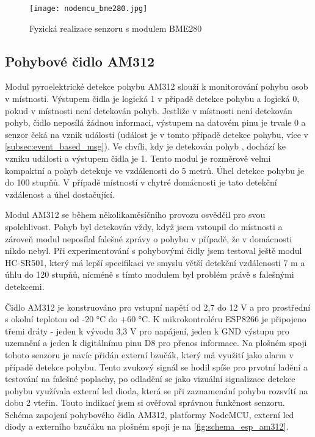 \begin{figure}[H]
  \centering
  \texttt{[image: nodemcu\_bme280.jpg]}
  \caption{Fyzická realizace senzoru s modulem BME280}
  \label{fig:nodemcu_bme280}
\end{figure} 

\subsection{Pohybové čidlo AM312}

Modul pyroelektrické detekce pohybu AM312 slouží k monitorování pohybu osob v místnosti. Výstupem čidla je logická 1 v případě detekce pohybu a logická 0, pokud v místnosti není detekován pohyb. Jestliže v místnosti není detekován pohyb, čidlo neposílá žádnou informaci, výstupem na datovém pinu je trvale 0 a senzor čeká na vznik události (událost je v tomto případě detekce pohybu, více v \cref{subsec:event_based_msg}). Ve chvíli, kdy je detekován pohyb , dochází ke vzniku události a výstupem čidla je 1. Tento modul je rozměrově velmi kompaktní a pohyb detekuje ve vzdálenosti do 5 metrů. Úhel detekce pohybu je do 100 stupňů. V případě místností v chytré domácnosti je tato detekční vzdálenost a úhel dostačující. \par 
Modul AM312 se během několikaměsíčního provozu osvědčil pro svou spolehlivost. Pohyb byl detekován vždy, když jsem vstoupil do místnosti a zároveň modul neposílal falešné zprávy o pohybu v případě, že v domácnosti nikdo nebyl. Při experimentování s pohybovými čidly jsem testoval ještě modul HC-SR501, který má lepší specifikaci ve smyslu větší detekční vzdálenosti 7 m a úhlu do 120 stupňů, nicméně s tímto modulem byl problém právě s falešnými detekcemi. \par
Čidlo AM312 je konstruováno pro vstupní napětí od 2,7 do 12 V a pro prostřední s okolní teplotou od -20 \si{\degree}C do +60 \si{\degree}C. K mikrokontroléru ESP8266 je připojeno třemi dráty - jeden k vývodu 3,3 V pro napájení, jeden k GND výstupu pro uzemnění a jeden k digitálnímu pinu D8 pro přenos informace. Na plošném spoji tohoto senzoru je navíc přidán externí bzučák, který má využití jako alarm v případě detekce pohybu. Tento zvukový signál se hodil spíše pro prvotní ladění a testování na falešné poplachy, po odladění se jako vizuální signalizace detekce pohybu využívala externí led dioda, která se při zaznamenání pohybu rozsvítí na dobu 2 vteřin. Touto indikací jsem si ověřoval správnou funkčnost senzoru. Schéma zapojení pohybového čidla AM312, platformy NodeMCU, externí led diody a externího bzučáku na plošném spoji je na \cref{fig:schema_esp_am312}. 

